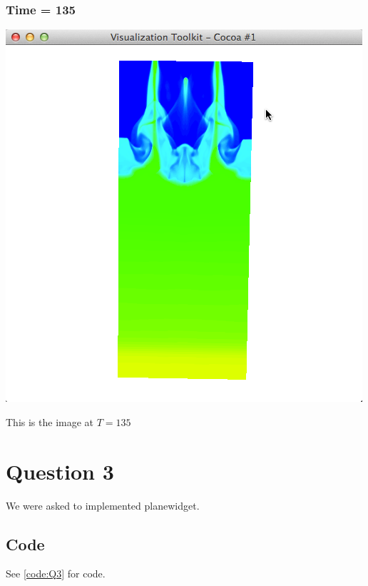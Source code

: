 \documentclass[11pt]{scrartcl}
\begin{document}
\subsubsection{Time = 135}
\begin{minipage}[t]{\linewidth}
{
\includegraphics[scale = 0.5]{img_2_135.png}

\centering
\medskip
{\footnotesize This is the image at $T = 135$}
}
\end{minipage}

\section{Question 3}
We were asked to implemented planewidget.
\subsection{Code}
See \ref{code:Q3} for code.
\end{document}
